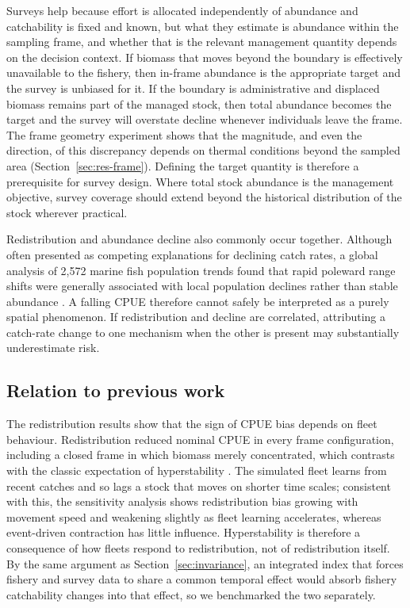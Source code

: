 \documentclass[11pt,a4paper]{article}
\begin{document}
Surveys help because effort is allocated independently of abundance and catchability is fixed and known, but what they estimate is abundance within the sampling frame, and whether that is the relevant management quantity depends on the decision context. If biomass that moves beyond the boundary is effectively unavailable to the fishery, then in-frame abundance is the appropriate target and the survey is unbiased for it. If the boundary is administrative and displaced biomass remains part of the managed stock, then total abundance becomes the target and the survey will overstate decline whenever individuals leave the frame. The frame geometry experiment shows that the magnitude, and even the direction, of this discrepancy depends on thermal conditions beyond the sampled area (Section~\ref{sec:res-frame}). Defining the target quantity is therefore a prerequisite for survey design. Where total stock abundance is the management objective, survey coverage should extend beyond the historical distribution of the stock wherever practical.

Redistribution and abundance decline also commonly occur together. Although often presented as competing explanations for declining catch rates, a global analysis of 2,572 marine fish population trends found that rapid poleward range shifts were generally associated with local population declines rather than stable abundance \citep{chaikin2024}. A falling CPUE therefore cannot safely be interpreted as a purely spatial phenomenon. If redistribution and decline are correlated, attributing a catch-rate change to one mechanism when the other is present may substantially underestimate risk.

\subsection{Relation to previous work}

The redistribution results show that the sign of CPUE bias depends on fleet behaviour. Redistribution reduced nominal CPUE in every frame configuration, including a closed frame in which biomass merely concentrated, which contrasts with the classic expectation of hyperstability \citep{harley2001,erisman2011}. The simulated fleet learns from recent catches and so lags a stock that moves on shorter time scales; consistent with this, the sensitivity analysis shows redistribution bias growing with movement speed and weakening slightly as fleet learning accelerates, whereas event-driven contraction has little influence. Hyperstability is therefore a consequence of how fleets respond to redistribution, not of redistribution itself. By the same argument as Section~\ref{sec:invariance}, an integrated index that forces fishery and survey data to share a common temporal effect would absorb fishery catchability changes into that effect, so we benchmarked the two separately.
\end{document}
